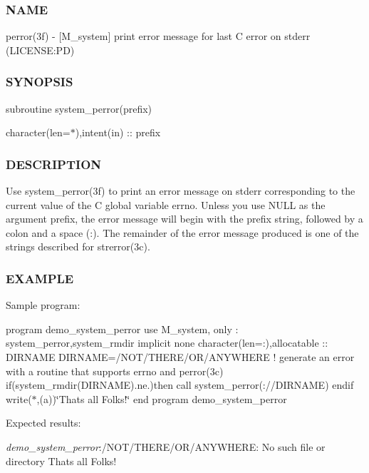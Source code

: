 \subsubsection*{N\+A\+ME}

perror(3f) -\/ \mbox{[}M\+\_\+system\mbox{]} print error message for last C error on stderr (L\+I\+C\+E\+N\+SE\+:PD) \subsubsection*{S\+Y\+N\+O\+P\+S\+IS}

subroutine system\+\_\+perror(prefix)

character(len=$\ast$),intent(in) \+:\+: prefix

\subsubsection*{D\+E\+S\+C\+R\+I\+P\+T\+I\+ON}

Use system\+\_\+perror(3f) to print an error message on stderr corresponding to the current value of the C global variable errno. Unless you use N\+U\+LL as the argument prefix, the error message will begin with the prefix string, followed by a colon and a space (\+:). The remainder of the error message produced is one of the strings described for strerror(3c).

\subsubsection*{E\+X\+A\+M\+P\+LE}

Sample program\+:

program demo\+\_\+system\+\_\+perror use M\+\_\+system, only \+: system\+\_\+perror,system\+\_\+rmdir implicit none character(len=\+:),allocatable \+:\+: D\+I\+R\+N\+A\+ME D\+I\+R\+N\+A\+ME=\textquotesingle{}/\+N\+O\+T/\+T\+H\+E\+R\+E/\+O\+R/\+A\+N\+Y\+W\+H\+E\+RE\textquotesingle{} ! generate an error with a routine that supports errno and perror(3c) if(system\+\_\+rmdir(\+D\+I\+R\+N\+A\+M\+E).ne.)then call system\+\_\+perror(\+:\textquotesingle{}//\+D\+I\+R\+N\+A\+ME) endif write($\ast$,\textquotesingle{}(a)\textquotesingle{})\char`\"{}\+That\textquotesingle{}s all Folks!\char`\"{} end program demo\+\_\+system\+\_\+perror

Expected results\+:

{\itshape demo\+\_\+system\+\_\+perror}\+:/\+N\+O\+T/\+T\+H\+E\+R\+E/\+O\+R/\+A\+N\+Y\+W\+H\+E\+RE\+: No such file or directory That\textquotesingle{}s all Folks! 

